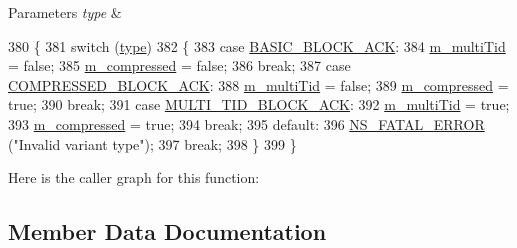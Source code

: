 \begin{DoxyParams}{Parameters}
{\em type} & \\
\hline
\end{DoxyParams}

\begin{DoxyCode}
380 \{
381   \textcolor{keywordflow}{switch} (\hyperlink{visualizer-ideas_8txt_add98db9e15e2a58cf2b57623e7aa893a}{type})
382     \{
383     \textcolor{keywordflow}{case} \hyperlink{namespacens3_a90f436472d19d7d7f37cbf0b8c288ff7a118b16b614e89a911b77a167632f89bf}{BASIC\_BLOCK\_ACK}:
384       \hyperlink{classns3_1_1CtrlBAckResponseHeader_ab3b2b175ee54daa240e3cc0450c5812e}{m\_multiTid} = \textcolor{keyword}{false};
385       \hyperlink{classns3_1_1CtrlBAckResponseHeader_a7d33c0c452139f1d9f110dab89bfcef7}{m\_compressed} = \textcolor{keyword}{false};
386       \textcolor{keywordflow}{break};
387     \textcolor{keywordflow}{case} \hyperlink{namespacens3_a90f436472d19d7d7f37cbf0b8c288ff7ad325114ff6e0d84c1d4cea5bd810a48c}{COMPRESSED\_BLOCK\_ACK}:
388       \hyperlink{classns3_1_1CtrlBAckResponseHeader_ab3b2b175ee54daa240e3cc0450c5812e}{m\_multiTid} = \textcolor{keyword}{false};
389       \hyperlink{classns3_1_1CtrlBAckResponseHeader_a7d33c0c452139f1d9f110dab89bfcef7}{m\_compressed} = \textcolor{keyword}{true};
390       \textcolor{keywordflow}{break};
391     \textcolor{keywordflow}{case} \hyperlink{namespacens3_a90f436472d19d7d7f37cbf0b8c288ff7a2b0db78cd77aa4769690b7b6aac6f017}{MULTI\_TID\_BLOCK\_ACK}:
392       \hyperlink{classns3_1_1CtrlBAckResponseHeader_ab3b2b175ee54daa240e3cc0450c5812e}{m\_multiTid} = \textcolor{keyword}{true};
393       \hyperlink{classns3_1_1CtrlBAckResponseHeader_a7d33c0c452139f1d9f110dab89bfcef7}{m\_compressed} = \textcolor{keyword}{true};
394       \textcolor{keywordflow}{break};
395     \textcolor{keywordflow}{default}:
396       \hyperlink{group__fatal_ga5131d5e3f75d7d4cbfd706ac456fdc85}{NS\_FATAL\_ERROR} (\textcolor{stringliteral}{"Invalid variant type"});
397       \textcolor{keywordflow}{break};
398     \}
399 \}
\end{DoxyCode}


Here is the caller graph for this function\+:




\subsection{Member Data Documentation}
